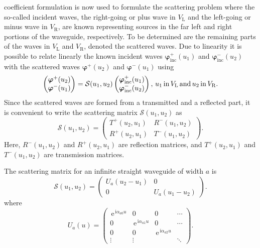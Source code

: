 \documentclass[numreferences]{kluwer}
\renewcommand{\phi}{\varphi}
\renewcommand{\vec}[1]{\bm{#1}}
\renewcommand{\i}{\,\mathrm{i}}
\newcommand{\e}{\,\mathrm{e}}
\begin{document}
coefficient formulation is now used to formulate the scattering
problem where the so-called incident waves, the right-going or plus
wave in $V_{\text{L}}$ and the left-going or minus wave in
$V_{\text{R}}$, are known representing sources in the far left and
right portions of the waveguide, respectively. To be determined are
the remaining parts of the waves in $V_{\text{L}}$ and $V_{\text{R}}$,
denoted the scattered waves. Due to linearity it is possible to relate
linearly the known incident waves $\bm{\phi}_{\text{inc}}^{+}(u_1)$
and $\bm{\phi}_{\text{inc}}^{-}(u_2)$ with the scattered waves
$\bm{\phi}^{+}(u_2)$ and $\bm{\phi}^{-}(u_1)$ using
\begin{equation}
  \label{107}
  \begin{pmatrix}
    \vec \phi^+(u_2)\\
    \vec \phi^-(u_1)
  \end{pmatrix}= \mathcal{S}(u_1,u_2)
  \begin{pmatrix}
    \vec \phi_{\text{inc}}^+(u_1)\\
    \vec \phi_{\text{inc}}^-(u_2)
  \end{pmatrix},\, u_1\, {\rm in}\, V_{\rm L}\, {\rm and}\, u_2\, {\rm
    in}\, V_{\rm R}.
\end{equation}
Since the scattered waves are formed from a transmitted and a
reflected part, it is convenient to write the scattering matrix $
\mathcal{S}(u_1,u_2)$ as
\begin{equation}
  \label{108}
  \mathcal{S}(u_1,u_2)=
  \begin{pmatrix}
    T^+(u_2,u_1)& R^-(u_1,u_2)\\
    R^+(u_2,u_1)& T^-(u_1,u_2)
  \end{pmatrix}
  .
\end{equation}
Here, $R^-(u_1,u_2)$ and $R^+(u_2,u_1)$ are reflection matrices, and
$T^+(u_2,u_1)$ and $T^-(u_1,u_2)$ are transmission matrices.

The scattering matrix for an infinite straight waveguide of width $a$
is
\begin{equation}
  \label{109}
  \mathcal{S}(u_1,u_2)=
  \begin{pmatrix}
    U_a(u_2-u_1)&0\\
    0&U_a(u_1-u_2)
  \end{pmatrix}
  .
\end{equation}
where
\begin{equation}
  \label{eq:S}
  U_a(u)=
  \begin{pmatrix}
    \e^{\i\alpha_{a0}u}&0&0&\cdots\\
    0&\e^{\i\alpha_{a1}u}&0&\cdots\\
    0&0&\e^{\i\alpha_{a2}u}&\\
    \vdots&\vdots&&\ddots
  \end{pmatrix}.
\end{equation}
\end{document}
